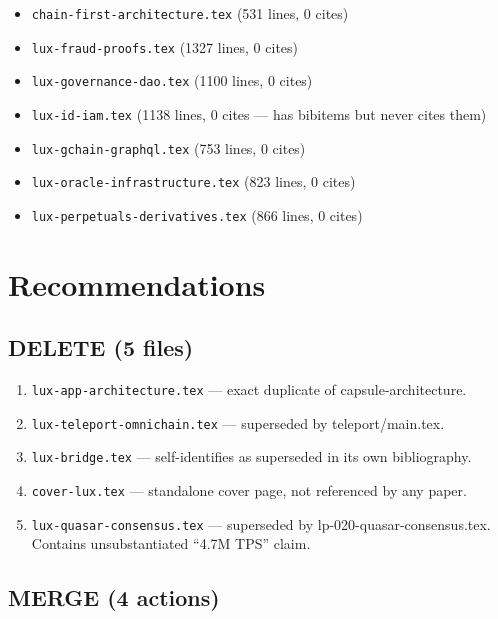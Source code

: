 \documentclass[11pt,a4paper]{article}
\begin{document}
\begin{itemize}[leftmargin=2em, itemsep=0pt]
\item \texttt{chain-first-architecture.tex} (531 lines, 0 cites)
\item \texttt{lux-fraud-proofs.tex} (1327 lines, 0 cites)
\item \texttt{lux-governance-dao.tex} (1100 lines, 0 cites)
\item \texttt{lux-id-iam.tex} (1138 lines, 0 cites --- has bibitems but never cites them)
\item \texttt{lux-gchain-graphql.tex} (753 lines, 0 cites)
\item \texttt{lux-oracle-infrastructure.tex} (823 lines, 0 cites)
\item \texttt{lux-perpetuals-derivatives.tex} (866 lines, 0 cites)
\end{itemize}

\section{Recommendations}

\subsection{DELETE (5 files)}

\begin{enumerate}
\item \texttt{lux-app-architecture.tex} --- exact duplicate of capsule-architecture.
\item \texttt{lux-teleport-omnichain.tex} --- superseded by teleport/main.tex.
\item \texttt{lux-bridge.tex} --- self-identifies as superseded in its own bibliography.
\item \texttt{cover-lux.tex} --- standalone cover page, not referenced by any paper.
\item \texttt{lux-quasar-consensus.tex} --- superseded by lp-020-quasar-consensus.tex. Contains unsubstantiated ``4.7M TPS'' claim.
\end{enumerate}

\subsection{MERGE (4 actions)}
\end{document}
